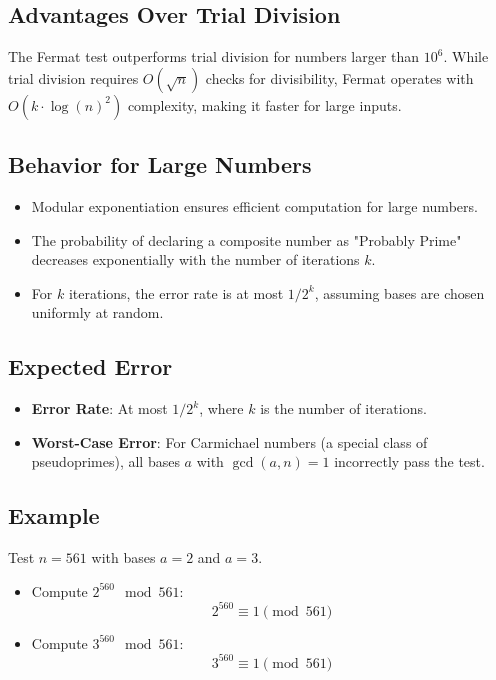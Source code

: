 \documentclass[12pt]{article}
\begin{document}
\subsection*{Advantages Over Trial Division}

The Fermat test outperforms trial division for numbers larger than \( 10^6 \). While trial division requires \( O(\sqrt{n}) \) checks for divisibility, Fermat operates with \( O(k \cdot \log(n)^2) \) complexity, making it faster for large inputs.

\subsection*{Behavior for Large Numbers}

\begin{itemize}
    \item Modular exponentiation ensures efficient computation for large numbers.
    \item The probability of declaring a composite number as "Probably Prime" decreases exponentially with the number of iterations \( k \).
    \item For \( k \) iterations, the error rate is at most \( 1 / 2^k \), assuming bases are chosen uniformly at random.
\end{itemize}

\subsection*{Expected Error}

\begin{itemize}
    \item \textbf{Error Rate}: At most \( 1 / 2^k \), where \( k \) is the number of iterations.
    \item \textbf{Worst-Case Error}: For Carmichael numbers (a special class of pseudoprimes), all bases \( a \) with \( \gcd(a, n) = 1 \) incorrectly pass the test.
\end{itemize}

\subsection*{Example}

Test \( n = 561 \) with bases \( a = 2 \) and \( a = 3 \).

\begin{itemize}
    \item Compute \( 2^{560} \mod 561 \):
    \[
    2^{560} \equiv 1 \pmod{561}
    \]
    \item Compute \( 3^{560} \mod 561 \):
    \[
    3^{560} \equiv 1 \pmod{561}
    \]
\end{itemize}
\end{document}
